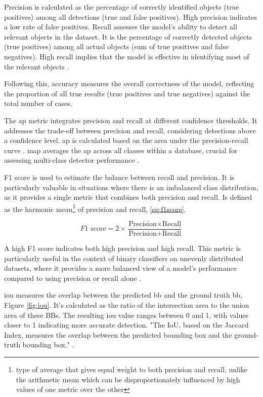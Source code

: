 Precision is calculated as the percentage of correctly identified objects (true positives) among all detections (true and false positives). High precision indicates a low rate of false positives. Recall assesses the model's ability to detect all relevant objects in the dataset. It is the percentage of correctly detected objects (true positives) among all actual objects (sum of true positives and false negatives). High recall implies that the model is effective in identifying most of the relevant objects \cite{rfc25}.

Following this, accuracy measures the overall correctness of the model, reflecting the proportion of all true results (true positives and true negatives) against the total number of cases.

The \ac{ap} metric integrates precision and recall at different confidence thresholds. It addresses the trade-off between precision and recall, considering detections above a confidence level. \ac{ap} is calculated based on the area under the precision-recall curve \cite{rfc25}. \ac{map} averages the \ac{ap} across all classes within a database, crucial for assessing multi-class detector performance \cite{rfc24}. 

F1 score is used to estimate the balance between recall and precision. It is particularly valuable in situations where there is an imbalanced class distribution, as it provides a single metric that combines both precision and recall. Is defined as the harmonic mean\footnote{type of average that gives equal weight to both precision and recall, unlike the arithmetic mean which can be disproportionately influenced by high values of one metric over the other} of precision and recall, \ref{eq:f1score}. 

\begin{equation}
    F1 \text{ score} = 2 \times \frac{\text{Precision} \times \text{Recall}}{\text{Precision} + \text{Recall}}
    \label{eq:f1score}
\end{equation}
    
A high F1 score indicates both high precision and high recall. This metric is particularly useful in the context of binary classifiers on unevenly distributed datasets, where it provides a more balanced view of a model's performance compared to using precision or recall alone \cite{rfc9}.

\ac{iou} measures the overlap between the predicted \ac{bb} and the ground truth \ac{bb}, Figure \ref{fig:iou}. It's calculated as the ratio of the intersection area to the union area of these BBs. The resulting \ac{iou} value ranges between 0 and 1, with values closer to 1 indicating more accurate detection. "The IoU, based on the Jaccard Index, measures the overlap between the predicted bounding box and the ground-truth bounding box." \cite{rfc24}.

